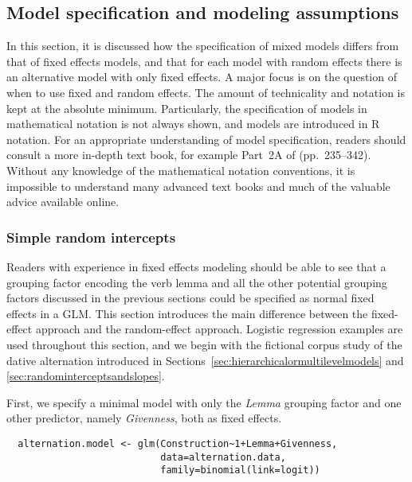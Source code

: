 \subsection{Model specification and modeling assumptions}
\label{sec:modelspecificationandmodelingassumptions}

In this section, it is discussed how the specification of mixed models differs from that of fixed effects models, and that for each model with random effects there is an alternative model with only fixed effects.
A major focus is on the question of when to use fixed and random effects.
The amount of technicality and notation is kept at the absolute minimum.
Particularly, the specification of models in mathematical notation is not always shown, and models are introduced in R notation.
For an appropriate understanding of model specification, readers should consult a more in-depth text book, for example Part~2A of \citet{GelmanHill2006} (pp.~235--342).
Without any knowledge of the mathematical notation conventions, it is impossible to understand many advanced text books and much of the valuable advice available online.

\subsubsection{Simple random intercepts}
\label{sec:simplerandomintercepts}

Readers with experience in fixed effects modeling should be able to see that a grouping factor encoding the verb lemma and all the other potential grouping factors discussed in the previous sections could be specified as normal fixed effects in a GLM.
This section introduces the main difference between the fixed-effect approach and the random-effect approach.
Logistic regression examples are used throughout this section, and we begin with the fictional corpus study of the dative alternation introduced in Sections~\ref{sec:hierarchicalormultilevelmodels} and \ref{sec:randominterceptsandslopes}.

First, we specify a minimal model with only the \textit{Lemma} grouping factor and one other predictor, namely \textit{Givenness}, both as fixed effects.

\begin{lstlisting}
  alternation.model <- glm(Construction~1+Lemma+Givenness,
                           data=alternation.data,
                           family=binomial(link=logit))
\end{lstlisting}

